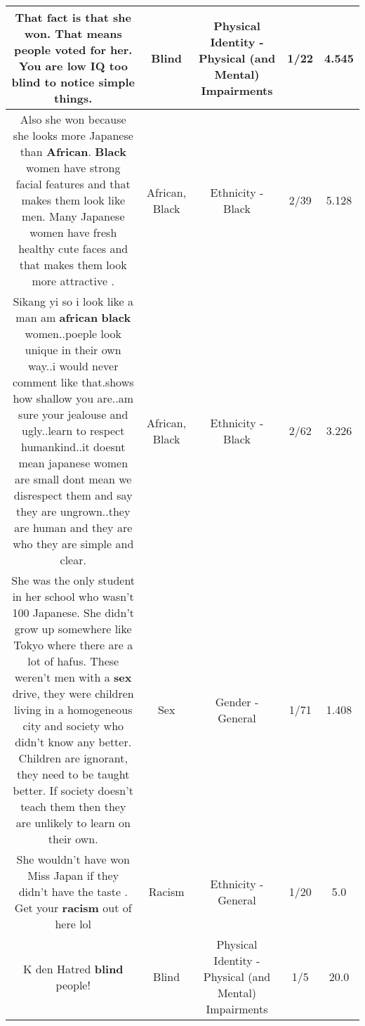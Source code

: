 \documentclass[11pt]{article}
\newlength\mylength
\begin{document}
\begin{center}
\begin{longtable}{|C{.65\mylength}|C{.30\mylength}|C{.12\mylength}|C{.12\mylength}|C{.12\mylength}|}
  \small That fact is that she won. That means people voted for her. You are low IQ too \textbf{blind} to notice simple things.\normalsize   & Blind & Physical Identity - Physical (and Mental) Impairments & 1/22 & 4.545 \\  \hline
  \small Also she won because she looks more Japanese than \textbf{African}. \textbf{Black} women have strong facial features and that makes them look like men. Many Japanese women have fresh healthy cute faces and that makes them look more attractive .\normalsize   & African, Black & Ethnicity - Black & 2/39 & 5.128 \\  \hline
  \small Sikang yi so i look like a man am \textbf{african} \textbf{black} women..poeple look unique in their own way..i would never comment like that.shows how shallow you are..am sure your jealouse and ugly..learn to respect humankind..it doesnt  mean japanese women are small dont mean we disrespect them and say they are ungrown..they are human and they are who they are simple and clear.\normalsize   & African, Black & Ethnicity - Black & 2/62 & 3.226 \\  \hline
  \small She was the only student in her school who wasn't 100 Japanese. She didn't grow up somewhere like Tokyo where there are a lot of hafus. These weren't men with a \textbf{sex} drive, they were children living in a homogeneous city and society who didn't know any better. Children are ignorant, they need to be taught better. If society doesn't teach them then they are unlikely to learn on their own.\normalsize   & Sex & Gender - General & 1/71 & 1.408 \\  \hline
  \small She wouldn't have won Miss Japan if they didn't have the taste . Get your \textbf{racism} out of here lol\normalsize   & Racism & Ethnicity - General & 1/20 & 5.0 \\  \hline
  \small K den Hatred \textbf{blind} people!\normalsize   & Blind & Physical Identity - Physical (and Mental) Impairments & 1/5 & 20.0 \\  \hline

\end{longtable}
\end{center}
\end{document}
